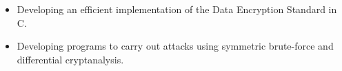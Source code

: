 

\begin{itemize}
    \item Developing an efficient implementation of the Data Encryption Standard in C.
    
    \item Developing programs to carry out attacks using symmetric brute-force and differential cryptanalysis.
\end{itemize}